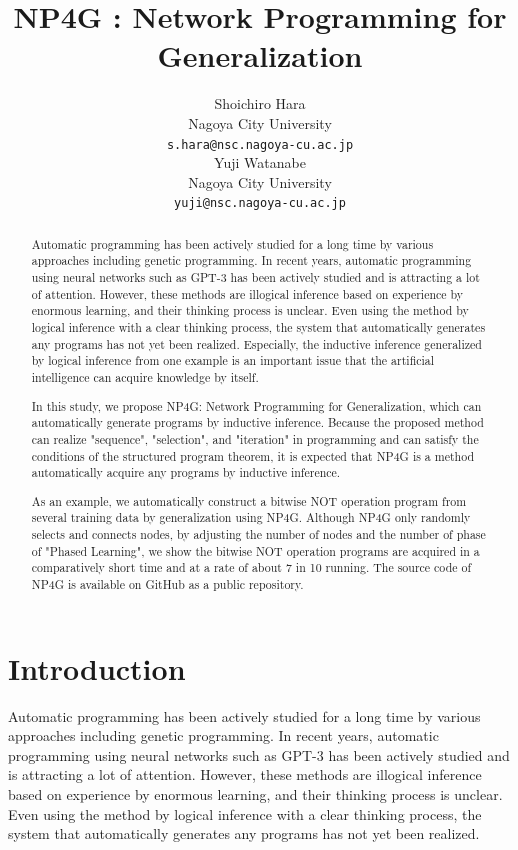 \documentclass{article}
\title{NP4G : Network Programming for Generalization
}
\author{
  Shoichiro Hara \\
  Nagoya City University \\
  \texttt{s.hara@nsc.nagoya-cu.ac.jp} \\
   \And
  Yuji Watanabe \\
  Nagoya City University \\
  \texttt{yuji@nsc.nagoya-cu.ac.jp} \\
}
\begin{document}
\maketitle

\begin{abstract}
 Automatic programming has been actively studied for a long time by various approaches including genetic programming. 
 In recent years, automatic programming using neural networks such as GPT-3 has been actively studied and is attracting a lot of attention. 
 However, these methods are illogical inference based on experience by enormous learning, and their thinking process is unclear. 
 Even using the method by logical inference with a clear thinking process, the system that automatically generates any programs has not yet been realized. 
 Especially, the inductive inference generalized by logical inference from one example is an important issue that the artificial intelligence can acquire knowledge by itself.
 
 In this study, we propose NP4G: Network Programming for Generalization, which can automatically generate programs by inductive inference. 
Because the proposed method can realize "sequence", "selection", and "iteration" in programming and can satisfy the conditions of the structured program theorem, it is expected that NP4G is a method automatically acquire any programs by inductive inference.
 
 As an example, we automatically construct a bitwise NOT operation program from several training data by generalization using NP4G. 
 Although NP4G only randomly selects and connects nodes, by adjusting the number of nodes and the number of phase of "Phased Learning", we show the bitwise NOT operation programs are acquired in a comparatively short time and at a rate of about 7 in 10 running.
 The source code of NP4G is available on GitHub as a public repository\footnotemark[1].
\end{abstract}



\section{Introduction}
Automatic programming has been actively studied for a long time by various approaches including genetic programming.
In recent years, automatic programming using neural networks such as GPT-3\cite{gpt3} has been actively studied and is attracting a lot of attention.
However, these methods are illogical inference based on experience by enormous learning, and their thinking process is unclear.
Even using the method by logical inference with a clear thinking process, the system that automatically generates any programs has not yet been realized.
\end{document}

